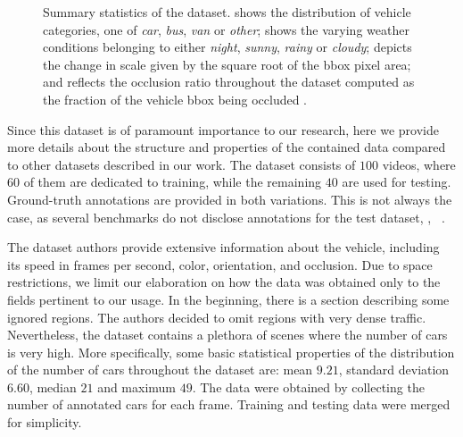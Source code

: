 \begin{figure}[t]
\begin{subfigure}[b]{\uadetracfigsize\textwidth}
        \caption[]{}
    \end{subfigure}
    \caption[\uadetrac{} dataset overview]{Summary statistics of the \uadetrac{} dataset.  shows the distribution of vehicle categories, one of \emph{car}, \emph{bus}, \emph{van} or \emph{other};  shows the varying weather conditions belonging to either \emph{night}, \emph{sunny}, \emph{rainy} or \emph{cloudy};  depicts the change in scale given by the square root of the \gls{bbox} pixel area; and  reflects the occlusion ratio throughout the dataset computed as the fraction of the vehicle \gls{bbox} being occluded . }
    \label{fig:UADETRACStats}
\end{figure}

Since this dataset is of paramount importance to our research, here we provide more details about the structure and properties of the contained data compared to other datasets described in our work. The dataset consists of $100$ videos, where $60$ of them are dedicated to training, while the remaining $40$ are used for testing. Ground-truth annotations are provided in both variations. This is not always the case, as several benchmarks do not disclose annotations for the test dataset, \egtext{}, ~\cite{geiger2012cvpr}.

The dataset authors provide extensive information about the vehicle, including its speed in frames per second, color, orientation, and occlusion. Due to space restrictions, we limit our elaboration on how the data was obtained only to the fields pertinent to our usage. In the beginning, there is a section describing some ignored regions. The authors decided to omit regions with very dense traffic. Nevertheless, the dataset contains a plethora of scenes where the number of cars is very high. More specifically, some basic statistical properties of the distribution of the number of cars throughout the dataset are: mean $9.21$, standard deviation $6.60$, median $21$ and maximum $49$. The data were obtained by collecting the number of annotated cars for each frame. Training and testing data were merged for simplicity.
